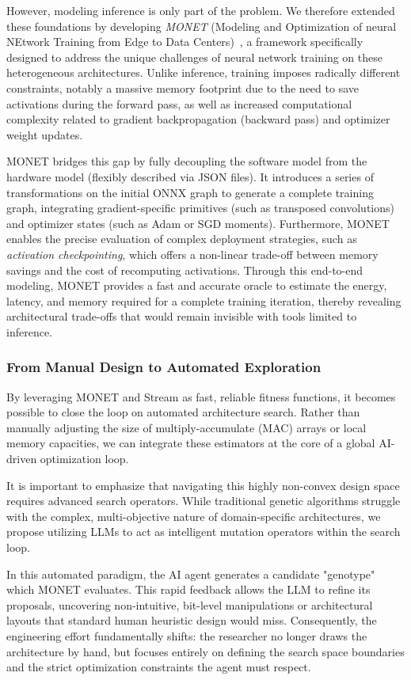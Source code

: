 \documentclass[11pt]{report}
\begin{document}
However, modeling inference is only part of the problem. We therefore extended these foundations by developing \textit{MONET} (Modeling and Optimization of neural NEtwork Training from Edge to Data Centers)~\cite{morlier2026monetmodelingoptimizationneural}, a framework specifically designed to address the unique challenges of neural network training on these heterogeneous architectures. Unlike inference, training imposes radically different constraints, notably a massive memory footprint due to the need to save activations during the forward pass, as well as increased computational complexity related to gradient backpropagation (backward pass) and optimizer weight updates.

MONET bridges this gap by fully decoupling the software model from the hardware model (flexibly described via JSON files). It introduces a series of transformations on the initial ONNX graph to generate a complete training graph, integrating gradient-specific primitives (such as transposed convolutions) and optimizer states (such as Adam or SGD moments). Furthermore, MONET enables the precise evaluation of complex deployment strategies, such as \textit{activation checkpointing}, which offers a non-linear trade-off between memory savings and the cost of recomputing activations. Through this end-to-end modeling, MONET provides a fast and accurate oracle to estimate the energy, latency, and memory required for a complete training iteration, thereby revealing architectural trade-offs that would remain invisible with tools limited to inference.

\subsubsection{From Manual Design to Automated Exploration}
By leveraging MONET and Stream as fast, reliable fitness functions, it becomes possible to close the loop on automated architecture search. Rather than manually adjusting the size of multiply-accumulate (MAC) arrays or local memory capacities, we can integrate these estimators at the core of a global AI-driven optimization loop.

It is important to emphasize that navigating this highly non-convex design space requires advanced search operators. While traditional genetic algorithms struggle with the complex, multi-objective nature of domain-specific architectures, we propose utilizing LLMs to act as intelligent mutation operators within the search loop.

In this automated paradigm, the AI agent generates a candidate "genotype" which MONET evaluates. This rapid feedback allows the LLM to refine its proposals, uncovering non-intuitive, bit-level manipulations or architectural layouts that standard human heuristic design would miss. Consequently, the engineering effort fundamentally shifts: the researcher no longer draws the architecture by hand, but focuses entirely on defining the search space boundaries and the strict optimization constraints the agent must respect.
\end{document}
